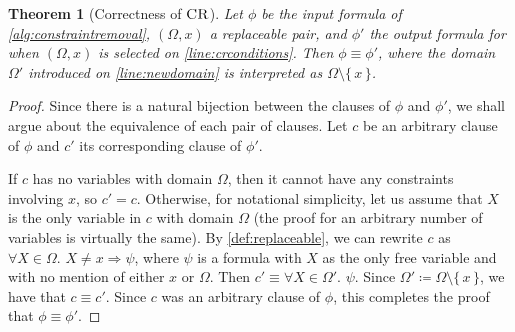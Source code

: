 \documentclass{article}
\newtheorem{theorem}{Theorem}
\DeclareMathOperator{\CR}{\textsc{CR}}
\begin{document}
\begin{theorem}[Correctness of $\CR$]
  Let $\phi$ be the input formula of \cref{alg:constraintremoval}, $(\Omega, x)$
  a replaceable pair, and $\phi'$ the output formula for when $(\Omega, x)$ is
  selected on \cref{line:crconditions}. Then $\phi \equiv \phi'$, where the
  domain $\Omega'$ introduced on \cref{line:newdomain} is interpreted as
  $\Omega \setminus \{\, x \,\}$.
\end{theorem}
\begin{proof}
  Since there is a natural bijection between the clauses of $\phi$ and $\phi'$,
  we shall argue about the equivalence of each pair of clauses. Let $c$ be an
  arbitrary clause of $\phi$ and $c'$ its corresponding clause of $\phi'$.

  If $c$ has no variables with domain $\Omega$, then it cannot have any
  constraints involving $x$, so $c' = c$. Otherwise, for notational simplicity,
  let us assume that $X$ is the only variable in $c$ with domain $\Omega$ (the
  proof for an arbitrary number of variables is virtually the same). By
  \cref{def:replaceable}, we can rewrite $c$ as $\forall X \in \Omega\text{.
  } X \ne x \Rightarrow \psi$, where $\psi$ is a formula with $X$ as the only free
  variable and with no mention of either $x$ or $\Omega$. Then
  $c' \equiv \forall X \in \Omega'\text{. } \psi$. Since
  $\Omega' \coloneqq \Omega \setminus \{\, x \,\}$, we have that $c \equiv c'$.
  Since $c$ was an arbitrary clause of $\phi$, this completes the proof that
  $\phi \equiv \phi'$.
\end{proof}
\end{document}

